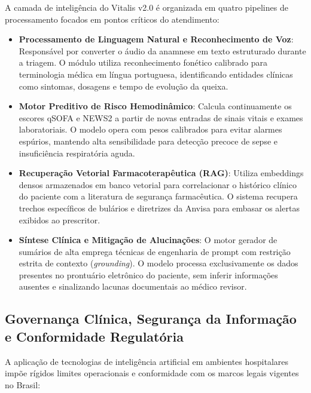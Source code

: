 A camada de inteligência do Vitalis v2.0 é organizada em quatro pipelines de processamento focados em pontos críticos do atendimento:

\begin{itemize}
    \item \textbf{Processamento de Linguagem Natural e Reconhecimento de Voz}: Responsável por converter o áudio da anamnese em texto estruturado durante a triagem. O módulo utiliza reconhecimento fonético calibrado para terminologia médica em língua portuguesa, identificando entidades clínicas como sintomas, dosagens e tempo de evolução da queixa.
    \item \textbf{Motor Preditivo de Risco Hemodinâmico}: Calcula continuamente os escores qSOFA e NEWS2 a partir de novas entradas de sinais vitais e exames laboratoriais. O modelo opera com pesos calibrados para evitar alarmes espúrios, mantendo alta sensibilidade para detecção precoce de sepse e insuficiência respiratória aguda.
    \item \textbf{Recuperação Vetorial Farmacoterapêutica (RAG)}: Utiliza embeddings densos armazenados em banco vetorial para correlacionar o histórico clínico do paciente com a literatura de segurança farmacêutica. O sistema recupera trechos específicos de bulários e diretrizes da Anvisa para embasar os alertas exibidos ao prescritor.
    \item \textbf{Síntese Clínica e Mitigação de Alucinações}: O motor gerador de sumários de alta emprega técnicas de engenharia de prompt com restrição estrita de contexto (\textit{grounding}). O modelo processa exclusivamente os dados presentes no prontuário eletrônico do paciente, sem inferir informações ausentes e sinalizando lacunas documentais ao médico revisor.
\end{itemize}

\subsection{Governança Clínica, Segurança da Informação e Conformidade Regulatória}
\label{subsec:governanca_conformidade}

A aplicação de tecnologias de inteligência artificial em ambientes hospitalares impõe rígidos limites operacionais e conformidade com os marcos legais vigentes no Brasil:

